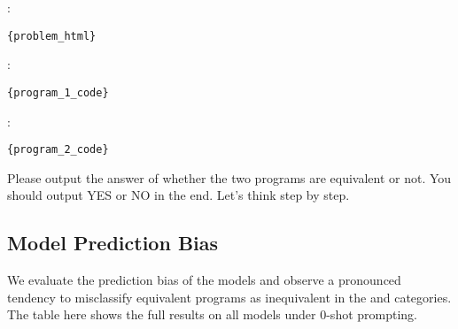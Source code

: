 :\\
\begin{lstlisting}
{problem_html}
\end{lstlisting}

\text{    [Program 1]}:\\
\begin{lstlisting}
{program_1_code}
\end{lstlisting}
\text{    [Program 2]}:\\
\begin{lstlisting}
{program_2_code}
\end{lstlisting}

Please output the answer of whether the two programs are equivalent or not. You should output YES or NO in the end. Let's think step by step.

\clearpage

\subsection{Model Prediction Bias}
\label{subsec:app:bias}

We evaluate the prediction bias of the models and observe a pronounced tendency to misclassify equivalent programs as inequivalent in the \cuda and \ass categories. The table here shows the full results on all models under 0-shot prompting.

